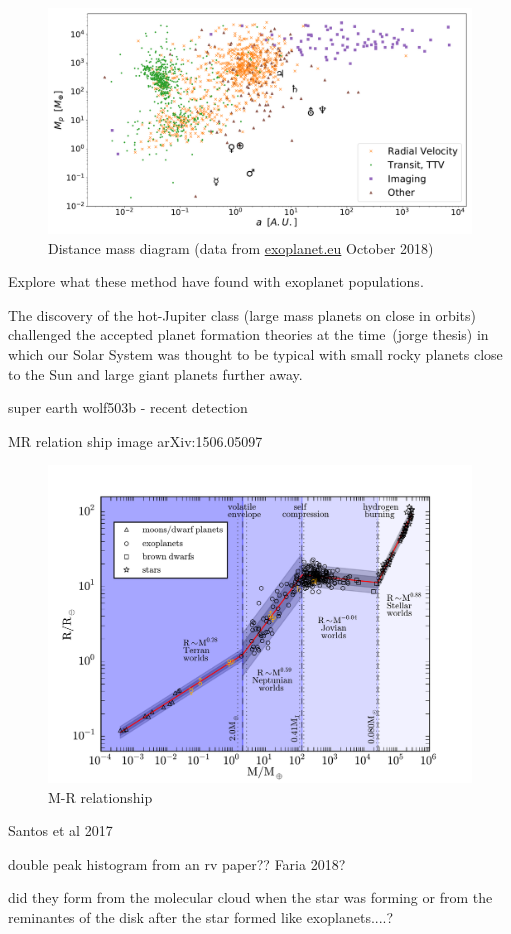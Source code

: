 \begin{figure}
    \centering
    \includegraphics[width=0.7\linewidth]{./figures/introduction/exoplanetEU_a_mass.pdf}
    \caption{Distance mass diagram (data from \href{http://ww.exoplanet.eu}{exoplanet.eu} October 2018)}
    \label{fig:pltoverlayadd}
\end{figure}


Explore what these method have found with exoplanet populations.

The discovery of the hot-Jupiter class (large mass planets on close in orbits) challenged the accepted planet formation theories at the time~\citep[.e.g][]{pollack_formation_1996}(jorge thesis) in which our Solar System was thought to be typical with small rocky planets close to the Sun and large giant planets further away.


super earth wolf503b - recent detection


MR relation ship image arXiv:1506.05097~\citet{chen_probabilistic_2016}

\begin{figure}
    \centering
    \includegraphics[width=0.4\linewidth]{./figures/introduction/mass_radius_relation.pdf}
    \caption{M-R relationship~\citet{chen_probabilistic_2016}}
    \label{fig:mass_radius_relation}
\end{figure}

Santos et al 2017 


double peak histogram from an rv paper?? Faria 2018?


did they form from the molecular cloud when the star was forming or from the reminantes of the disk after the star formed like exoplanets....?


